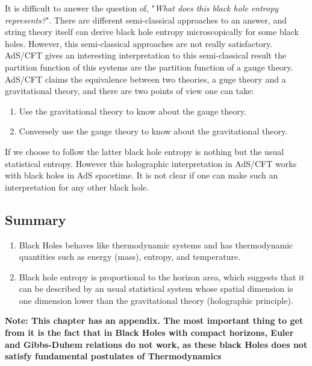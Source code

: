 \documentclass[12pt]{article}
\begin{document}
It is difficult to answer the question of, "\textit{What does this black hole entropy represents?}". There are different semi-classical approaches to an answer, and string theory itself can derive black hole entropy microscopically for some black holes. However, this semi-classical approaches are not really satisfactory. AdS/CFT gives an interesting interpretation to this semi-classical result the partition function of this systems are the partition function of a gauge theory. AdS/CFT claims the equivalence between two theories, a guge theory and a gravitational theory, and there are two points of view one can take:
\begin{enumerate}
    \item Use the gravitational theory to know about the gauge theory.
    \item Conversely use the gauge theory to know about the gravitational theory.
\end{enumerate}

If we choose to follow the latter black hole entropy is nothing but the usual statistical entropy. However this holographic interpretation in AdS/CFT works with black holes in AdS spacetime. It is not clear if one can make such an interpretation for any other black hole.


\subsection{Summary}
\begin{enumerate}
    \item Black Holes behaves like thermodynamic systems and has thermodynamic quantities such as energy (mass), entropy, and temperature.
    \item Black hole entropy is proportional to the horizon area, which suggests that it can be described by an usual statistical system whose spatial dimension is one dimension lower than the gravitational theory (holographic principle).
\end{enumerate}

\textbf{Note: This chapter has an appendix. The most important thing to get from it is the fact that in Black Holes with compact horizons, Euler and Gibbs-Duhem relations do not work, as these black Holes does not satisfy fundamental postulates of Thermodynamics}
\end{document}
